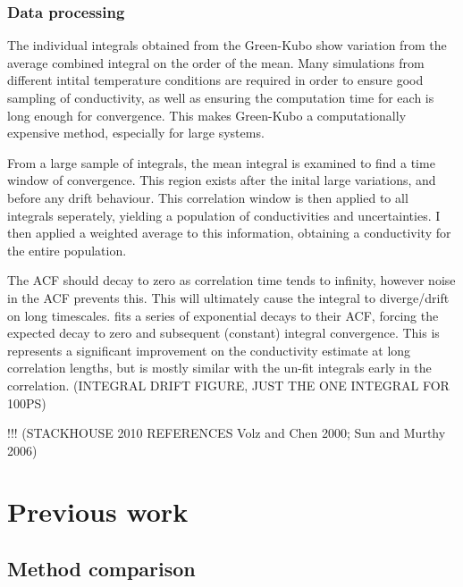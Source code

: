 \subsubsection{Data processing}

The individual integrals obtained from the Green-Kubo show variation from the average combined integral on the order of the mean. Many simulations from different intital temperature conditions are required in order to ensure good sampling of conductivity, as well as ensuring the computation time for each is long enough for convergence. This makes Green-Kubo a computationally expensive method, especially for large systems.

From a large sample of integrals, the mean integral is examined to find a time window of convergence. This region exists after the inital large variations, and before any drift behaviour. This correlation window is then applied to all integrals seperately, yielding a population of conductivities and uncertainties. I then applied a weighted average to this information, obtaining a conductivity for the entire population.

The ACF should decay to zero as correlation time tends to infinity, however noise in the ACF prevents this. This will ultimately cause the integral to diverge/drift on long timescales. \citet{Howell2012} fits a series of exponential decays to their ACF, forcing the expected decay to zero and subsequent (constant) integral convergence. This is represents a significant improvement on the conductivity estimate at long correlation lengths, but is mostly similar with the un-fit integrals early in the correlation. (INTEGRAL DRIFT FIGURE, JUST THE ONE INTEGRAL FOR 100PS)

!!! (STACKHOUSE 2010 REFERENCES Volz and Chen 2000; Sun and Murthy 2006)







\section{Previous work}

\subsection{Method comparison}


